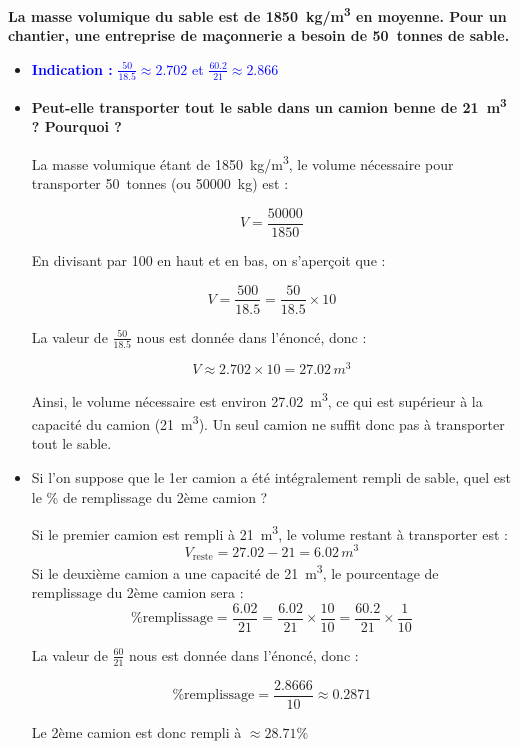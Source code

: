 \documentclass{exam}
\begin{document}
\begin{questions}
  \question[2] \textbf{La masse volumique du sable est de \SI{1850}{kg/m^3} en moyenne. Pour un chantier, une entreprise de maçonnerie a besoin de \SI{50}{tonnes} de sable.}

  \begin{itemize}
    \item \textcolor{blue}{\textbf{Indication :} $\frac{50}{18.5} \approx 2.702$ et $\frac{60.2}{21} \approx 2.866$}
    
    \item \textbf{Peut-elle transporter tout le sable dans un camion benne de \SI{21}{m^3} ? Pourquoi ?}

    La masse volumique étant de \SI{1850}{kg/m^3}, le volume nécessaire pour transporter \SI{50}{tonnes} (ou \SI{50000}{kg}) est :

    \[
    V = \frac{50000}{1850}
    \]

    En divisant par 100 en haut et en bas, on s'aperçoit que :

    \[
    V = \frac{500}{18.5} = \frac{50}{18.5} \times 10
    \]

    La valeur de \(\frac{50}{18.5}\) nous est donnée dans l'énoncé, donc :

    \[
    V \approx 2.702 \times 10 = 27.02\,\si{m^3}
    \]

    Ainsi, le volume nécessaire est environ \SI{27.02}{m^3}, ce qui est supérieur à la capacité du camion (\SI{21}{m^3}). Un seul camion ne suffit donc pas à transporter tout le sable.
    \item Si l'on suppose que le 1er camion a été intégralement rempli de sable, quel est le \% de remplissage du 2ème camion ?
    
    Si le premier camion est rempli à \SI{21}{m^3}, le volume restant à transporter est :
    \[
    V_{\text{reste}} = 27.02 - 21 = 6.02\,\si{m^3}
    \]
    Si le deuxième camion a une capacité de \SI{21}{m^3}, le pourcentage de remplissage du 2ème camion sera :
    \[
    \text{\% remplissage} = \frac{6.02}{21} = \frac{6.02}{21} \times \frac{10}{10} = \frac{60.2}{21} \times \frac{1}{10}
    \]
    
    La valeur de \(\frac{60}{21}\) nous est donnée dans l'énoncé, donc :

    \[
      \text{\% remplissage} = \frac{2.8666}{10} \approx 0.2871 
    \]

    Le 2ème camion est donc rempli à $\approx 28.71\%$
    
  \end{itemize}


\end{questions}
\end{document}
